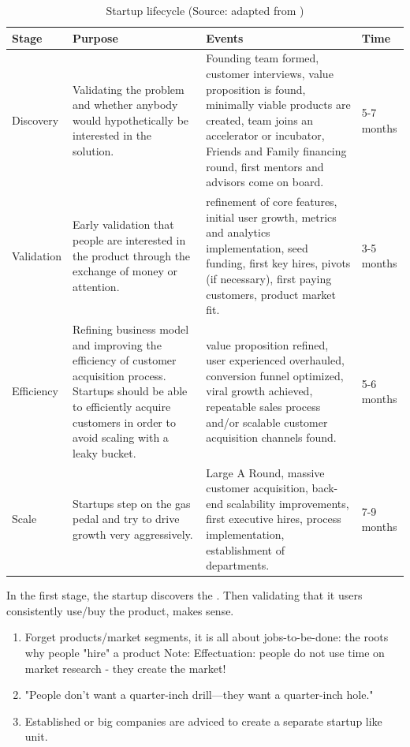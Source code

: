 \documentclass[a4paper,10pt]{article}
\begin{document}
\begin{center}
\begin{table}
  \begin{tabular}{ | l | p{5cm} | p{6cm} | p{1.8cm} | }
    \hline
    Stage 	& Purpose 						& Events	& Time \\ \hline
    Discovery 	& Validating the problem and whether anybody would hypothetically be interested in
		  the solution.
		& Founding team formed, customer interviews,
		  value proposition is found, minimally viable products are created, team joins an
		  accelerator or incubator, Friends and Family financing round, first mentors and
		  advisors come on board.		& 5-7 months \\ \hline
    Validation 	& Early validation that people are interested in
		  the product through the exchange of money or attention.
		& refinement of core features, initial user growth, metrics and analytics
		  implementation, seed funding, first key hires, pivots (if necessary), first paying
		  customers, product market fit.	& 3-5 months \\ \hline
    Efficiency 	& Refining business model and improving the efficiency of 
		  customer acquisition process. Startups should be able to efficiently acquire
		  customers in order to avoid scaling with a leaky bucket.
		& value proposition refined, user experienced overhauled, conversion
		  funnel optimized, viral growth achieved, repeatable sales process and/or
		  scalable customer acquisition channels found.	& 5-6 months \\ \hline		  
    Scale
		& Startups step on the gas pedal and try to drive growth very aggressively.
		& Large A Round, massive customer acquisition, back-end scalability
		  improvements, first executive hires, process implementation, establishment of
		  departments.		& 7-9 months \\ \hline


    \end{tabular}
    \caption{Startup lifecycle (Source: adapted from \cite{genomeOriginalReport}) \label{fig:startupLifecycle}}
  \end{table}
\end{center}

In the first stage, the startup discovers the . Then validating that it users consistently use/buy the product, makes sense.







\begin{enumerate}
 \item Forget products/market segments, it is all about jobs-to-be-done: the roots why people "hire" a product \cite{reinvetingBusinessModel}
       Note: Effectuation: people do not use time on market research - they create the market!
 \item "People don’t want a quarter-inch drill—they want a quarter-inch hole."
 \item Established or big companies are adviced to create a separate startup like unit.
\end{enumerate}
\end{document}
